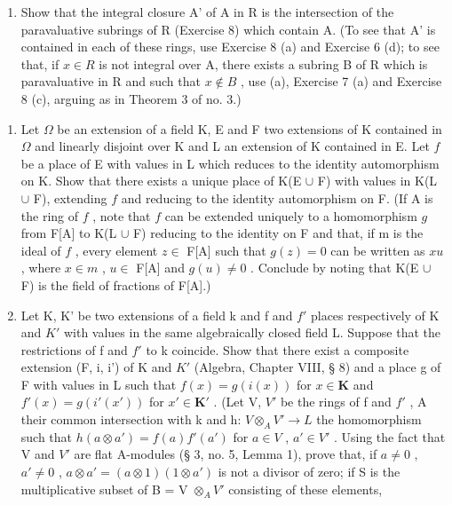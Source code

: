 \begin{enumerate}
\def\labelenumi{(\alph{enumi})}
\setcounter{enumi}{1}
\tightlist
\item
  Show that the integral closure A' of A in R is the intersection of the paravaluative subrings of R (Exercise 8) which contain A. (To see that A' is contained in each of these rings, use Exercise 8 (a) and Exercise 6 (d); to see that, if \(x \in R\) is not integral over A, there exists a subring B of R which is paravaluative in R and such that \(x \notin B\) , use (a), Exercise 7 (a) and Exercise 8 (c), arguing as in Theorem 3 of no. 3.)
\end{enumerate}


\begin{enumerate}
\def\labelenumi{\arabic{enumi}.}
\item
  Let \(\Omega\) be an extension of a field K, E and F two extensions of K contained in \(\Omega\) and linearly disjoint over K and L an extension of K contained in E. Let \(f\) be a place of E with values in L which reduces to the identity automorphism on K. Show that there exists a unique place of K(E \(\cup\) F) with values in K(L \(\cup\) F), extending \(f\) and reducing to the identity automorphism on F. (If A is the ring of \(f\) , note that \(f\) can be extended uniquely to a homomorphism \(g\) from F{[}A{]} to K(L \(\cup\) F) reducing to the identity on F and that, if m is the ideal of \(f\) , every element \(z \in\) F{[}A{]} such that \(g(z) = 0\) can be written as \(xu\) , where \(x \in m\) , \(u \in\) F{[}A{]} and \(g(u) \neq 0\) . Conclude by noting that K(E \(\cup\) F) is the field of fractions of F{[}A{]}.)
\item
  Let K, K' be two extensions of a field k and f and \(f'\) places respectively of K and \(K'\) with values in the same algebraically closed field L. Suppose that the restrictions of f and \(f'\) to k coincide. Show that there exist a composite extension (F, i, i') of K and \(K'\) (Algebra, Chapter VIII, § 8) and a place g of F with values in L such that \(f(x) = g(i(x))\) for \(x \in \mathbf{K}\) and \(f'(x) = g(i'(x'))\) for \(x' \in \mathbf{K}'\) . (Let V, \(V'\) be the rings of f and \(f'\) , A their common intersection with k and h: \(V \otimes_{A} V' \to L\) the homomorphism such that \(h(a \otimes a') = f(a)f'(a')\) for \(a \in V\) , \(a' \in V'\) . Using the fact that V and \(V'\) are flat A-modules (§ 3, no. 5, Lemma 1), prove that, if \(a \neq 0\) , \(a' \neq 0\) , \(a \otimes a' = (a \otimes 1)(1 \otimes a')\) is not a divisor of zero; if S is the multiplicative subset of B = V \(\otimes_{A} V'\) consisting of these elements,
\end{enumerate}

